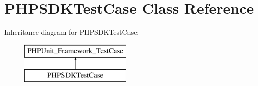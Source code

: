\hypertarget{class_p_h_p_s_d_k_test_case}{\section{P\-H\-P\-S\-D\-K\-Test\-Case Class Reference}
\label{class_p_h_p_s_d_k_test_case}
}
Inheritance diagram for P\-H\-P\-S\-D\-K\-Test\-Case\-:\begin{figure}[H]
\begin{center}
\leavevmode
\includegraphics[height=2.000000cm]{class_p_h_p_s_d_k_test_case}
\end{center}
\end{figure}
